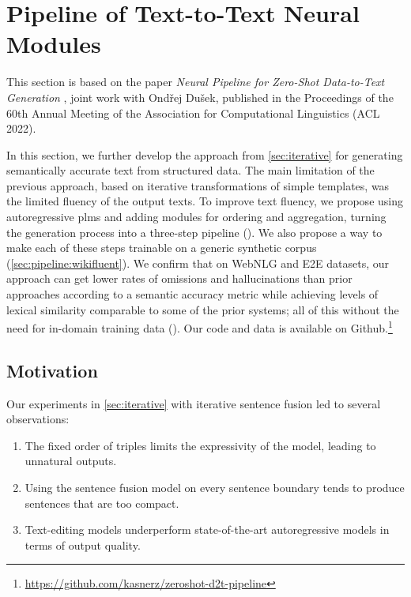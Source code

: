 \section{Pipeline of Text-to-Text Neural Modules}
\label{sec:pipeline}
\begin{refbox}
    This section is based on the paper \emph{Neural Pipeline for Zero-Shot Data-to-Text Generation} \cite{kasner2022neural}, joint work with Ondřej Dušek, published in the Proceedings of the 60th Annual Meeting of the Association for Computational Linguistics (ACL 2022).
\end{refbox}

In this section, we further develop the approach from \autoref{sec:iterative} for generating semantically accurate text from structured data. The main limitation of the previous approach, based on iterative transformations of simple templates, was the limited fluency of the output texts. To improve text fluency, we propose using autoregressive \acp{plm} and adding modules for ordering and aggregation, turning the generation process into a three-step pipeline (). We also propose a way to make each of these steps trainable on a generic synthetic corpus (\autoref{sec:pipeline:wikifluent}). We confirm that on WebNLG and E2E datasets, our approach can get lower rates of omissions and hallucinations than prior approaches according to a semantic accuracy metric while achieving levels of lexical similarity comparable to some of the prior systems; all of this without the need for in-domain training data (). Our code and data is available on Github.\footnote{\url{https://github.com/kasnerz/zeroshot-d2t-pipeline}}


\subsection{Motivation}
Our experiments in \autoref{sec:iterative} with iterative sentence fusion led to several observations:

\begin{enumerate}
    \item The fixed order of triples limits the expressivity of the model, leading to unnatural outputs.
    \item Using the sentence fusion model on every sentence boundary tends to produce sentences that are too compact.
    \item Text-editing models underperform state-of-the-art autoregressive models in terms of output quality.
\end{enumerate}

